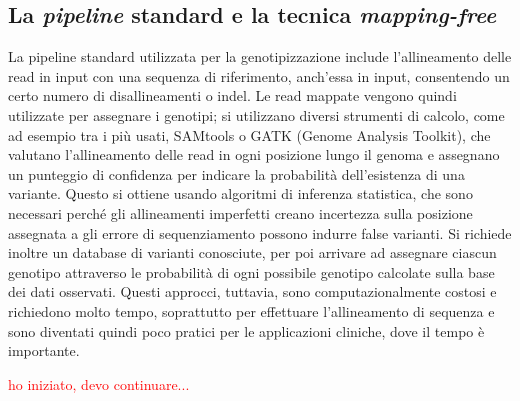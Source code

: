 \documentclass[../main.tex]{subfiles}
\begin{document}
\subsection{La \textit{pipeline} standard e la tecnica \textit{mapping-free}}


La pipeline standard utilizzata per la genotipizzazione include l'allineamento delle read in input con una sequenza di riferimento, anch'essa in input, consentendo un certo numero di disallineamenti o indel. Le read mappate vengono quindi utilizzate per assegnare i genotipi; si utilizzano diversi strumenti di calcolo, come ad esempio tra i più usati, SAMtools o GATK (Genome Analysis Toolkit), che valutano l'allineamento delle read in ogni posizione lungo il genoma e assegnano un punteggio di confidenza per indicare la probabilità dell'esistenza di una variante. Questo si ottiene usando algoritmi di inferenza statistica, che sono necessari perché gli allineamenti imperfetti creano incertezza sulla posizione assegnata a gli errore di sequenziamento possono indurre false varianti. Si richiede inoltre un database di varianti conosciute, per poi arrivare ad assegnare ciascun genotipo attraverso le probabilità di ogni possibile genotipo calcolate sulla base dei dati osservati. Questi approcci, tuttavia, sono computazionalmente costosi e richiedono molto tempo, soprattutto per effettuare l'allineamento di sequenza e sono diventati quindi poco pratici per le applicazioni cliniche, dove il tempo è importante. 


\textcolor{red}{ho iniziato, devo continuare...}
\end{document}
